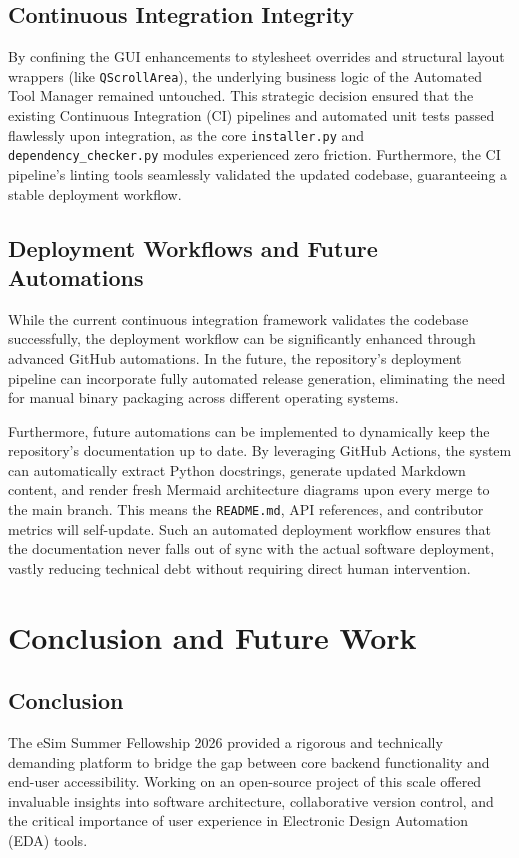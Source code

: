 \documentclass[12pt,a4paper]{report}
\begin{document}
\section{Continuous Integration Integrity}
By confining the GUI enhancements to stylesheet overrides and structural layout wrappers (like \texttt{QScrollArea}), the underlying business logic of the Automated Tool Manager remained untouched. This strategic decision ensured that the existing Continuous Integration (CI) pipelines and automated unit tests passed flawlessly upon integration, as the core \texttt{installer.py} and \texttt{dependency\_checker.py} modules experienced zero friction. Furthermore, the CI pipeline's linting tools seamlessly validated the updated codebase, guaranteeing a stable deployment workflow.

\section{Deployment Workflows and Future Automations}
While the current continuous integration framework validates the codebase successfully, the deployment workflow can be significantly enhanced through advanced GitHub automations. In the future, the repository's deployment pipeline can incorporate fully automated release generation, eliminating the need for manual binary packaging across different operating systems.

Furthermore, future automations can be implemented to dynamically keep the repository's documentation up to date. By leveraging GitHub Actions, the system can automatically extract Python docstrings, generate updated Markdown content, and render fresh Mermaid architecture diagrams upon every merge to the main branch. This means the \texttt{README.md}, API references, and contributor metrics will self-update. Such an automated deployment workflow ensures that the documentation never falls out of sync with the actual software deployment, vastly reducing technical debt without requiring direct human intervention.

\chapter{Conclusion and Future Work}
\section{Conclusion}
The eSim Summer Fellowship 2026 provided a rigorous and technically demanding platform to bridge the gap between core backend functionality and end-user accessibility. Working on an open-source project of this scale offered invaluable insights into software architecture, collaborative version control, and the critical importance of user experience in Electronic Design Automation (EDA) tools.
\end{document}

